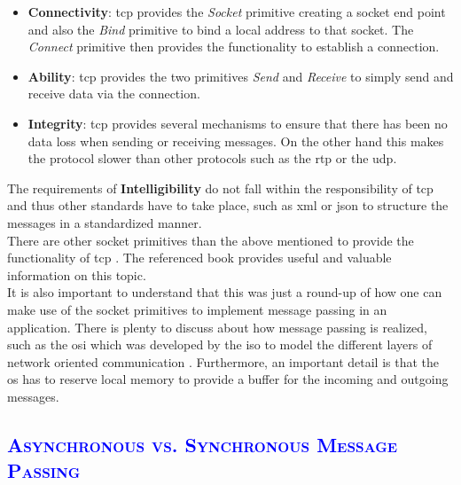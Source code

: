 \documentclass[xcolor=dvipsnames]{article}
\begin{document}
\begin{itemize}

\item \textbf{Connectivity}: \gls{tcp} provides the \textit{Socket} primitive creating a socket end point and also the \textit{Bind} primitive to bind a local address to that socket. The \textit{Connect} primitive then provides the functionality to establish a connection.

\item \textbf{Ability}: \gls{tcp} provides the two primitives \textit{Send} and \textit{Receive} to simply send and receive data via the connection.

\item \textbf{Integrity}: \gls{tcp} provides several mechanisms to ensure that there has been no data loss when sending or receiving messages. On the other hand this makes the protocol slower than other protocols such as the \gls{rtp} or the \gls{udp}.

\end{itemize}

\noindent The requirements of \textbf{Intelligibility} do not fall within the responsibility of \gls{tcp} and thus other standards have to take place, such as \gls{xml} or \gls{json} to structure the messages in a standardized manner.\\

\noindent There are other socket primitives than the above mentioned to provide the functionality of \gls{tcp} \cite[ch. 4.3.1 on p. 141]{tanenbaum}. The referenced book \cite{tanenbaum} provides useful and valuable information on this topic.\\

\noindent It is also important to understand that this was just a round-up of how one can make use of the socket primitives to implement message passing in an application. There is plenty to discuss about how message passing is realized, such as the \gls{osi} which was developed by the \gls{iso} to model the different layers of network oriented communication \cite[ch. 4.1.1 on p. 116]{tanenbaum}. Furthermore, an important detail is that the \gls{os} has to reserve local memory to provide a buffer for the incoming and outgoing messages.

\subsection{\scshape{\textcolor{blue}{Asynchronous vs. Synchronous Message Passing}}}
\end{document}
